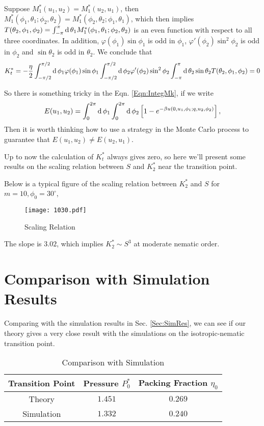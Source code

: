 Suppose $M_1^*(u_1,u_2)=M_1^*(u_2,u_1)$, then $M_1^*(\phi_1,\theta_1;\phi_2,\theta_2)=M_1^*(\phi_2,\theta_2;\phi_1,\theta_1)$, which then implies $T(\theta_2,\phi_1,\phi_2)=\int_{-\pi}^{\pi}\operatorname{d}\theta_1M_1^*(\phi_1,\theta_1;\phi_2,\theta_2)$ is an even function with respect to all three coordinates. In addition, $\varphi(\phi_1)\sin\phi_1$ is odd in $\phi_1$, $\varphi'(\phi_2)\sin^2\phi_2$ is odd in $\phi_2$ and $\sin\theta_2$ is odd in $\theta_2$. We conclude that
\begin{equation}
	K_t^*=-\frac{\eta}{2}\int_{-\pi/2}^{\pi/2}\operatorname{d}\phi_1\varphi(\phi_1)\sin\phi_1\int_{-\pi/2}^{\pi/2}\operatorname{d}\phi_2\varphi'(\phi_2)\sin^2\phi_2\int_{-\pi}^{\pi}\operatorname{d}\theta_2\sin\theta_2T(\theta_2, \phi_1,\phi_2)=0
\end{equation}

So there is something tricky in the Eqn. \ref{Eqn:IntegMk}, if we write
\begin{equation}
	E(u_1,u_2)=\int_0^{2\pi}\operatorname{d}\phi_1\int_0^{2\pi}\operatorname{d}\phi_2 \left[1-e^{-\beta u(0,u_1, \phi_1; q,u_2, \phi_2)}\right],
\end{equation}
Then it is worth thinking how to use a strategy in the Monte Carlo process to guarantee that $E(u_1,u_2)\neq E(u_2,u_1)$.

Up to now the calculation of $K_t^*$ always gives zero, so here we'll present some results on the scaling relation between $S$ and $K_2^*$ near the transition point.

Below is a typical figure of the scaling relation between $K_2^*$ and $S$ for $m=10,\phi_0=30^\circ$,
\begin{figure}[H]
 	\centering
 	\texttt{[image: 1030.pdf]} \\
	\caption[Scaling relation]{Scaling Relation}
	\label{fig:scaling}
\end{figure}
The slope is $3.02$, which implies $K_2^*\sim S^3$ at moderate nematic order.

\section{Comparison with Simulation Results}
Comparing with the simulation results in Sec. \ref{Sec:SimRes}, we can see if our theory gives a very close result with the simulations on the isotropic-nematic transition point.
\begin{table}[H]
	\caption{Comparison with Simulation}
	\label{tab:compsim}
	\centering
	\begin{tabular}{c|cc}
		\toprule
		Transition Point & Pressure $P_0^*$ & Packing Fraction $\eta_0$ \\
		\midrule
		Theory &  $1.451$ & $0.269$\\
		Simulation & $1.332$ & $0.240$\\
		\bottomrule
	\end{tabular}
\end{table}

